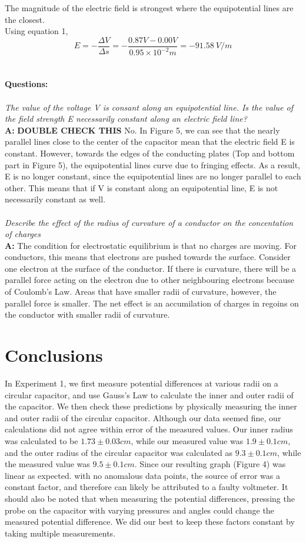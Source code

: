 \documentclass[letterpaper]{article}
\begin{document}
The magnitude of the electric field is strongest where the equipotential lines are the closest.\\
Using equation 1,
$$ E=-\frac{\Delta V}{\Delta s}= -\frac{0.87 V -0.00 V}{0.95\times 10^{-2} m} = -91.58 \:V/m $$
\\ \\
\textbf{Questions: }\\ \\
\textit{The value of the voltage V is consant along an equipotential line.
Is the value of the field strength E necessarily constant along an electric field line?}\\
\textbf{A:}
\textbf{DOUBLE CHECK THIS} No. In Figure 5, we can see that
the nearly parallel lines close to the center of the capacitor mean that the electric field E is constant.
However, towards the edges of the conducting plates (Top and bottom part in Figure 5), the equipotential lines
curve due to fringing effects. As a result, E is no longer constant, since the equipotential lines
are no longer parallel to each other. This means that if V is constant along an equipotential line,
E is not necessarily constant as well.\\ \\
\textit{Describe the effect of the radius of curvature of a conductor on the concentation of charges}\\
\textbf{A:}
The condition for electrostatic equilibrium is that no charges are moving. For conductors, this means
that electrons are pushed towards the surface. Consider one electron at the surface of the conductor.
If there is curvature, there will be a parallel force acting on the electron due to other neighbouring
electrons because of Coulomb's Law. Areas that have smaller radii of curvature, however, the
parallel force is smaller. The net effect is an accumilation of charges in regoins on the conductor with
smaller radii of curvature.

\section{Conclusions}
In Experiment 1, we first measure potential differences at various radii on a circular capacitor,
and use Gauss's Law to calculate the inner and outer radii of the capacitor. We then check these predictions
by physically measuring the inner and outer radii of the circular capacitor. Although our data seemed
fine, our calculations did not agree within error of the measured values. Our inner radius was calculated to be
$1.73 \pm 0.03 cm$, while our measured value was $1.9 \pm 0.1 cm$, and the outer radius of the circular capacitor
was calculated as $9.3 \pm 0.1 cm$, while the measured value was $9.5 \pm 0.1 cm$. Since our resulting graph (Figure 4)
was linear as expected. with no anomalous data points, the source of error was a constant factor, and therefore can
likely be attributed to a faulty voltmeter. It should also be noted that when measuring the potential differences, pressing
the probe on the capacitor with varying pressures and angles could change the measured potential difference.
We did our best to keep these factors constant by taking multiple measurements.
\end{document}
